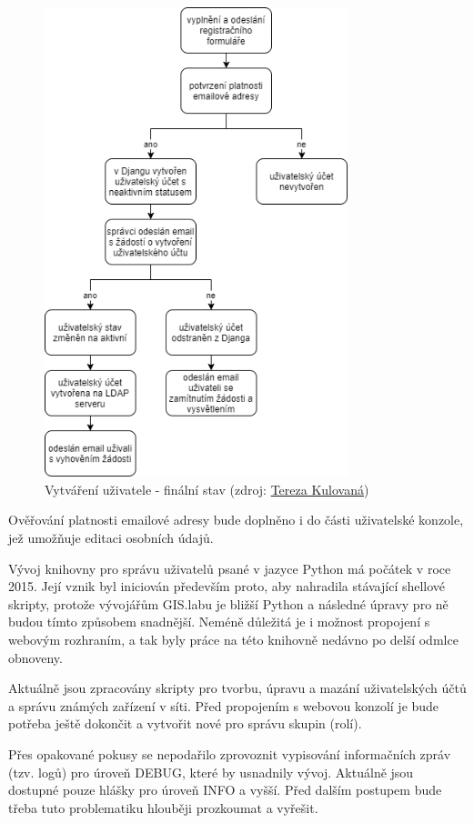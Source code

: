 \begin{figure}[H] \centering
    \includegraphics[width=250pt]{./pictures/my_console_final_version_cz.png}
    \caption[Vytváření uživatele - finální stav]{Vytváření uživatele - finální stav (zdroj:
	\href{}{Tereza Kulovaná})}
    \label{fig:admin-final}
\end{figure}

Ověřování platnosti emailové adresy bude doplněno i do části
uživatelské konzole, jež umožňuje editaci osobních údajů.

Vývoj knihovny pro správu uživatelů psané v jazyce Python má počátek v
roce 2015. Její vznik byl iniciován především proto, aby nahradila
stávající shellové skripty, protože vývojářům GIS.labu je bližší
Python a následné úpravy pro ně budou tímto způsobem snadnější. Neméně
důležitá je i možnost propojení s webovým rozhraním, a tak byly práce
na této knihovně nedávno po delší odmlce obnoveny.

Aktuálně jsou zpracovány skripty pro tvorbu, úpravu a mazání
uživatelských účtů a správu známých zařízení v síti.  Před propojením
s webovou konzolí je bude potřeba ještě dokončit a vytvořit nové pro
správu skupin (rolí).
  
Přes opakované pokusy se nepodařilo zprovoznit vypisování informačních
zpráv (tzv. logů) pro úroveň DEBUG, které by usnadnily vývoj. Aktuálně
jsou dostupné pouze hlášky pro úroveň INFO a vyšší. Před dalším
postupem bude třeba tuto problematiku hlouběji prozkoumat a vyřešit.

